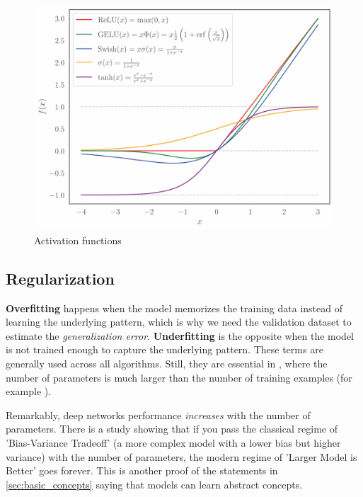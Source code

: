 \begin{figure}[htb]
    \centering
    \includegraphics[width=1\linewidth]{src/img/activation_functions_a.pdf}
    \caption{Activation functions}
    \label{fig:activations}
\end{figure}

\subsection{Regularization}
\label{sec:regularization}
\textbf{Overfitting} happens when the model memorizes the training data instead of learning the underlying pattern, which is why we need the validation dataset to estimate the \emph{generalization error}.
\textbf{Underfitting} is the opposite when the model is not trained enough to capture the underlying pattern.
These terms are generally used across all \ml algorithms. 
Still, they are essential in \dl, where the number of parameters is much larger than the number of training examples (for example \cite{deit3,gpt3}).

Remarkably, deep networks performance \emph{increases} with the number of parameters.
There is a study \cite{double_descent} showing that if you pass the classical regime of 'Bias-Variance Tradeoff' (a more complex model with a lower bias but higher variance) with the number of parameters, the modern regime of 'Larger Model is Better' goes forever.
This is another proof of the statements in \cref{sec:basic_concepts} saying that \dl models can learn abstract concepts. 

